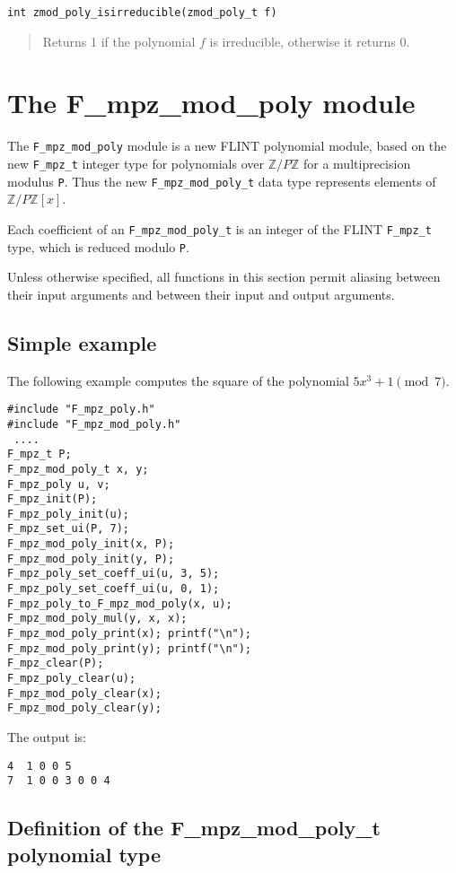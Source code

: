 \documentclass[a4paper,10pt]{article}
\newcommand{\Z}{\mathbb{Z}}
\newcommand{\code}{\lstinline}
\begin{document}
\begin{lstlisting}
int zmod_poly_isirreducible(zmod_poly_t f) 
\end{lstlisting}
\begin{quote}
Returns 1 if the polynomial $f$ is irreducible, otherwise it returns 0.
\end{quote}

\section{The F\_mpz\_mod\_poly module}

The \code{F_mpz_mod_poly} module is a new FLINT polynomial module, based on the new \code{F_mpz_t} integer 
type for polynomials over $\Z/P\Z$ for a multiprecision modulus \code{P}. Thus the new 
\code{F_mpz_mod_poly_t} data type represents elements of $\Z/P\Z[x]$. 

Each coefficient of an \code{F_mpz_mod_poly_t} is an integer of the FLINT \code{F_mpz_t} type, which is
reduced modulo \code{P}. 

Unless otherwise specified, all functions in this section permit aliasing between their input arguments 
and between their input and output arguments. 

\subsection{Simple example}

The following example computes the square of the polynomial $5x^3 + 1 \pmod{7}$. 

\begin{lstlisting}
#include "F_mpz_poly.h"
#include "F_mpz_mod_poly.h"
 ....
F_mpz_t P;
F_mpz_mod_poly_t x, y;
F_mpz_poly u, v;
F_mpz_init(P);
F_mpz_poly_init(u);
F_mpz_set_ui(P, 7);
F_mpz_mod_poly_init(x, P);
F_mpz_mod_poly_init(y, P);
F_mpz_poly_set_coeff_ui(u, 3, 5);
F_mpz_poly_set_coeff_ui(u, 0, 1);
F_mpz_poly_to_F_mpz_mod_poly(x, u);
F_mpz_mod_poly_mul(y, x, x);
F_mpz_mod_poly_print(x); printf("\n");
F_mpz_mod_poly_print(y); printf("\n");
F_mpz_clear(P);
F_mpz_poly_clear(u);
F_mpz_mod_poly_clear(x);
F_mpz_mod_poly_clear(y);
\end{lstlisting}

The output is:

\begin{lstlisting}
4  1 0 0 5
7  1 0 0 3 0 0 4
\end{lstlisting}

\subsection{Definition of the F\_mpz\_mod\_poly\_t polynomial type}
\end{document}
